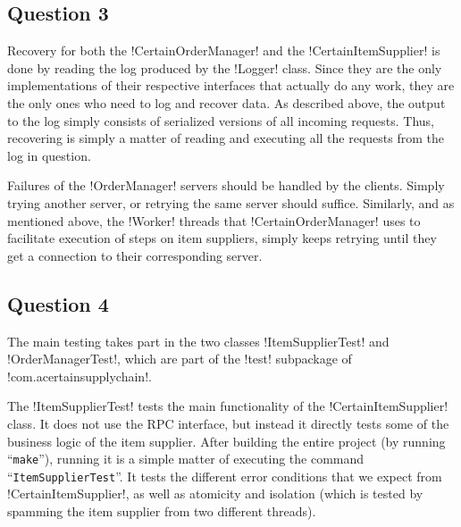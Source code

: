 \documentclass[a4paper, 12pt]{article}
\begin{document}
\subsection*{Question 3}


Recovery for both the !CertainOrderManager! and the
!CertainItemSupplier! is done by reading the log produced by the
!Logger! class. Since they are the only implementations of their
respective interfaces that actually do any work, they are the only
ones who need to log and recover data. As described above, the output
to the log simply consists of serialized versions of all incoming
requests. Thus, recovering is simply a matter of reading and executing
all the requests from the log in question.

Failures of the !OrderManager! servers should be handled by the
clients. Simply trying another server, or retrying the same server
should suffice. Similarly, and as mentioned above, the !Worker!
threads that !CertainOrderManager! uses to facilitate execution of
steps on item suppliers, simply keeps retrying until they get a
connection to their corresponding server.


\subsection*{Question 4}





The main testing takes part in the two classes !ItemSupplierTest! and
!OrderManagerTest!, which are part of the !test! subpackage of
!com.acertainsupplychain!.

The !ItemSupplierTest! tests the main functionality of the
!CertainItemSupplier! class. It does not use the RPC interface, but
instead it directly tests some of the business logic of the item
supplier. After building the entire project (by running
``\texttt{make}''), running it is a simple matter of executing the
command ``\texttt{ItemSupplierTest}''. It tests the
different error conditions that we expect from !CertainItemSupplier!,
as well as atomicity and isolation (which is tested by spamming the
item supplier from two different threads).
\end{document}
